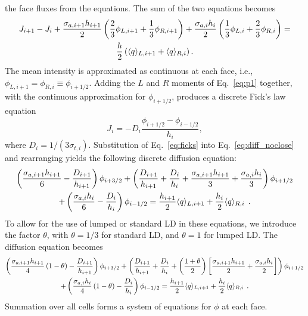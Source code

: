 the face fluxes from the equations.  The sum of the two equations becomes
\begin{multline}\label{eq:diff_noclose}
    J_{i+1} - J_{i} + \frac{\sigma_{a,i+1} h_{i+1}}{2}\left(\frac{2}{3} \phi_{L,i+1} +
    \frac{1}{3}\phi_{R,i+1}\right) + \frac{\sigma_{a,i} h_i}{2} \left( \frac{1}{3} \phi_{L,i} +
    \frac{2}{3}\phi_{R,i}\right) =\\ \frac{h}{2} \left(\langle q \rangle_{L,i+1} + \langle q \rangle_{R,i}
    \right).
\end{multline}
The mean intensity is approximated as continuous at each face, i.e., $\phi_{L,i+1} = \phi_{R,i}
\equiv \phi_{i+1/2}$.  Adding the $L$ and $R$ moments of Eq.~\eqref{eq:p1} together, with
the continuous approximation for $\phi_{i+1/2}$, produces a discrete Fick's law equation~\cite{stacy}
\begin{equation}\label{eq:ficks}
    J_{i} = -D_i \frac{\phi_{i+1/2} - \phi_{i-1/2}}{h_i},
\end{equation}
where $D_i = 1/(3\sigma_{t,i})$.
Substitution of Eq.~\eqref{eq:ficks} into Eq.~\eqref{eq:diff_noclose} and rearranging yields the following discrete diffusion
equation:
\begin{multline}
        \left(\frac{\sigma_{a,i+1} h_{i+1}}{6} -
        \frac{D_{i+1}}{h_{i+1}}\right)\phi_{i+3/2} + \left(\frac{D_{i+1}}{h_{i+1}} +
        \frac{D_{i}}{h_i} + \frac{\sigma_{a,i+1} h_{i+1}}{3} + \frac{\sigma_{a,i}
        h_{i}}{3}\right)\phi_{i+1/2} \\ + \left(\frac{\sigma_{a,i} h_{i}}{6} -
        \frac{D_{i}}{h_{i}}\right)\phi_{i-1/2} = \frac{h_{i+1}}{2} \langle q \rangle_{L,i+1} +
        \frac{h_{i}}{2}\langle q \rangle_{R,i}\;\,. 
\end{multline}
To allow for the use of lumped
or standard LD in these equations, we introduce the factor $\theta$, with
$\theta=1/3$ for standard
LD, and $\theta=1$ for lumped LD.  The diffusion equation becomes
\begin{multline}\label{eq:dsa_lumped}
    \left(\frac{\sigma_{a,i+1} h_{i+1}}{4}\left(1 - \theta\right)  -
        \frac{D_{i+1}}{h_{i+1}}\right)\phi_{i+3/2} + \left(\frac{D_{i+1}}{h_{i+1}} +
        \frac{D_{i}}{h_i} + \left(\frac{1+\theta}{2} \right)\left[\frac{\sigma_{a,i+1} h_{i+1}}{2} + \frac{\sigma_{a,i}
        h_{i}}{2}\right]\right)\phi_{i+1/2} \\ + \left(\frac{\sigma_{a,i}
        h_{i}}{4}\left(1 - \theta\right) -
        \frac{D_{i}}{h_{i}}\right)\phi_{i-1/2} = \frac{h_{i+1}}{2} \langle q \rangle_{L,i+1} +
        \frac{h_{i}}{2}\langle q \rangle_{R,i}
        \;\,. 
\end{multline}
Summation over all cells forms a system of equations for $\phi$ at each face.  


